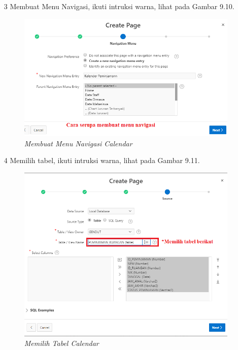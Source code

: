 \begin{itemize}
\begin{figure}
    \end{figure}
    \item[3]Membuat Menu Navigasi, ikuti intruksi warna, lihat pada Gambar 9.10.
    \begin{figure}
        \centering
        \includegraphics[scale=0.4]{figures/date/date3.png}
        \caption{\textit{Membuat Menu Navigasi Calendar}}
        \label{Membuat Menu Navigasi Calendar}
    \end{figure}
    \item[4]Memilih tabel, ikuti intruksi warna, lihat pada Gambar 9.11.
    \begin{figure}
        \centering
        \includegraphics[scale=0.4]{figures/date/date4.png}
        \caption{\textit{Memilih Tabel Calendar}}
        \label{Memilih Tabel Calendar}
    \end{figure}

\end{itemize}
